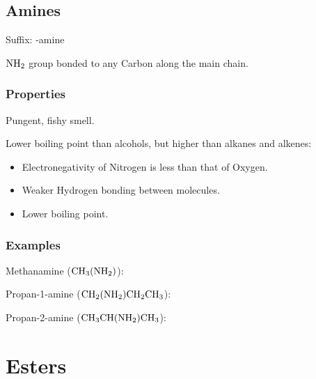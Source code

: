 \documentclass[a4paper,11pt]{article}
\begin{document}
\subsection{Amines}

Suffix: -amine

$\ce{NH2}$ group bonded to any Carbon along the main chain.


\subsubsection{Properties}

Pungent, fishy smell.

Lower boiling point than alcohols, but higher than alkanes and alkenes:

\begin{itemize}
\item Electronegativity of Nitrogen is less than that of Oxygen.
\item Weaker Hydrogen bonding between molecules.
\item Lower boiling point.
\end{itemize}


\subsubsection{Examples}

Methanamine ($\ce{CH3(NH2)}$):

\begin{center}
\end{center}

Propan-1-amine ($\ce{CH2(NH2)CH2CH3}$):

\begin{center}
\end{center}

Propan-2-amine ($\ce{CH3CH(NH2)CH3}$):

\begin{center}
\end{center}




\section{Esters}
\end{document}

